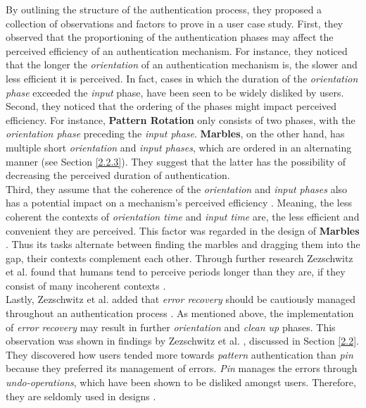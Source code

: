 By outlining the structure of the authentication process, they proposed a collection of observations and factors to prove in a user case study. First, they observed that the proportioning of the authentication phases may affect the perceived efficiency of an authentication mechanism. For instance, they noticed that the longer the \textit{orientation} of an authentication mechanism is, the slower and less efficient it is perceived. In fact, cases in which the duration of the \textit{orientation phase} exceeded the \textit{input} phase, have been seen to be widely disliked by users. \\

Second, they noticed that the ordering of the phases might impact perceived efficiency. For instance, \textbf{Pattern Rotation} only consists of two phases, with the \textit{orientation phase} preceding the \textit{input phase}. \textbf{Marbles}, on the other hand, has multiple short \textit{orientation} and \textit{input phases}, which are ordered in an alternating manner (see Section \ref{2.2.3}). They suggest that the latter has the possibility of decreasing the perceived duration of authentication. \\

Third, they assume that the coherence of the \textit{orientation} and \textit{input phases} also has a potential impact on a mechanism's perceived efficiency \cite{Zezschwitz}. Meaning, the less coherent the contexts of \textit{orientation time} and \textit{input time} are, the less efficient and convenient they are perceived. This factor was regarded in the design of \textbf{Marbles} \cite{Marbles}. Thus its tasks alternate between finding the marbles and dragging them into the gap, their contexts complement each other. Through further research Zezschwitz et al. \cite{Zezschwitz} found that humans tend to perceive periods longer than they are, if they consist of many incoherent contexts \cite{Zezschwitz,perception}.\\

Lastly, Zezschwitz et al. \cite{Zezschwitz} added that \textit{error recovery} should be cautiously managed throughout an authentication process \cite{Zezschwitz}. As mentioned above, the implementation of \textit{error recovery} may result in further \textit{orientation} and \textit{clean up} phases. This observation was shown in findings by Zezschwitz et al. \cite{PatternWild}, discussed in Section \ref{2.2}. They discovered how users tended more towards \textit{pattern} authentication than \textit{pin} because they preferred its management of errors. \textit{Pin} manages the errors through \textit{undo-operations}, which have been shown to be disliked amongst users. Therefore, they are seldomly used in designs \cite{PatternWild, Zezschwitz}. 


